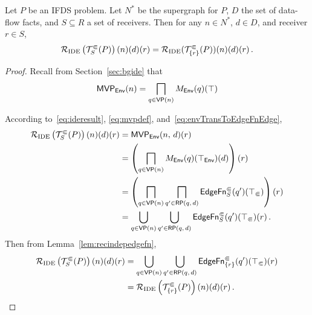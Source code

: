 \begin{lemma}\label{lem:recindep} Let $P$ be an IFDS problem. Let $N^*$ be the supergraph for $P$, $D$ the set of data-flow facts, and $S\subseteq R$ a set of receivers.
  Then for any $n\in N^*$, $d\in D$, and receiver $r\in S$,
  \begin{equation}
    \mathcal R_{\text{IDE}}\left(\mathcal T^\Subset_S(P)\right)(n)(d)(r)=
    \mathcal R_{\text{IDE}}(\mathcal T^\Subset_{\{r\}}(P))(n)(d)(r)\,.
  \end{equation}
\end{lemma}
\begin{proof} Recall from Section~\ref{sec:bgide} that
\begin{equation}\label{eq:mvpdef}
  \textsf{MVP}_{\textsf{Env}}(n)=\bigsqcap_{q\in\textsf{VP}(n)}M_\textsf{Env}(q)(\top)
\end{equation}

  According to~\eqref{eq:ideresult}, \eqref{eq:mvpdef}, and~\eqref{eq:envTransToEdgeFnEdge},
  \begin{align}
    \mathcal R_{\text{IDE}}\left(\mathcal T^\Subset_S(P)\right)(n)(d)(r)
    &=\textsf{MVP}_{\textsf{Env}}(n,\,d)(r)\notag\\
    &=\left(\bigsqcap_{q\in\textsf{VP}(n)}M_\textsf{Env}(q)(\top_\textsf{Env})(d)\right)(r)\notag\\
    &=\left(\bigsqcap_{q\in\textsf{VP}(n)}\bigsqcap_{q'\in\mathsf{RP}(q,\,d)}\textsf{EdgeFn}^\Subset_{S}(q')(\top_\Subset)\right)(r)\notag\\
    &=\bigcup_{q\in\textsf{VP}(n)}\bigcup_{q'\in\mathsf{RP}(q,\,d)}\textsf{EdgeFn}^\Subset_{S}(q')(\top_\Subset)(r)\,.\label{eq:resultThroughEdgefn}
  \end{align}
  Then from Lemma~\ref{lem:recindepedgefn},
  \begin{align*}
    \mathcal R_{\text{IDE}}\left(\mathcal T^\Subset_S(P)\right)(n)(d)(r)
    &=\bigcup_{q\in\textsf{VP}(n)}\bigcup_{q'\in\mathsf{RP}(q,\,d)}\textsf{EdgeFn}^\Subset_{\{r\}}(q')(\top_\Subset)(r)\\
    &=\mathcal R_{\text{IDE}}\left(\mathcal T^\Subset_{\{r\}}(P)\right)(n)(d)(r)\,.\qedhere
  \end{align*}
\end{proof}

